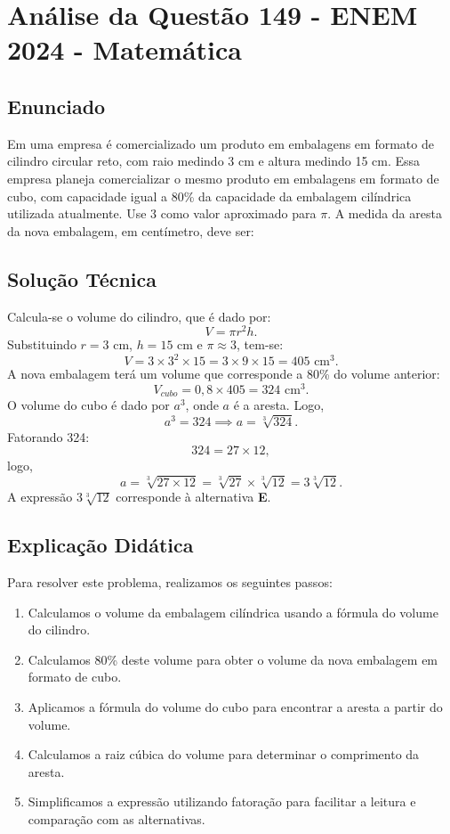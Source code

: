 \documentclass{article}
\begin{document}
\section*{Análise da Questão 149 - ENEM 2024 - Matemática}

\subsection*{Enunciado}
Em uma empresa é comercializado um produto em embalagens em formato de cilindro circular reto, com raio medindo 3 cm e altura medindo 15 cm. Essa empresa planeja comercializar o mesmo produto em embalagens em formato de cubo, com capacidade igual a 80\% da capacidade da embalagem cilíndrica utilizada atualmente. Use 3 como valor aproximado para $\pi$. A medida da aresta da nova embalagem, em centímetro, deve ser:

\bigskip

\subsection*{Solução Técnica}

Calcula-se o volume do cilindro, que é dado por:
\[
V = \pi r^{2} h.
\]
Substituindo $r = 3$ cm, $h = 15$ cm e $\pi \approx 3$, tem-se:
\[
V = 3 \times 3^{2} \times 15 = 3 \times 9 \times 15 = 405 \text{ cm}^3.
\]
A nova embalagem terá um volume que corresponde a 80\% do volume anterior:
\[
V_{cubo} = 0,8 \times 405 = 324 \text{ cm}^3.
\]
O volume do cubo é dado por $a^{3}$, onde $a$ é a aresta. Logo,
\[
a^{3} = 324 \implies a = \sqrt[3]{324}.
\]
Fatorando 324:
\[
324 = 27 \times 12,
\]
logo,
\[
a = \sqrt[3]{27 \times 12} = \sqrt[3]{27} \times \sqrt[3]{12} = 3 \sqrt[3]{12}.
\]
A expressão $3 \sqrt[3]{12}$ corresponde à alternativa \textbf{E}.

\subsection*{Explicação Didática}

Para resolver este problema, realizamos os seguintes passos:
\begin{enumerate}
  \item Calculamos o volume da embalagem cilíndrica usando a fórmula do volume do cilindro.
  \item Calculamos 80\% deste volume para obter o volume da nova embalagem em formato de cubo.
  \item Aplicamos a fórmula do volume do cubo para encontrar a aresta a partir do volume.
  \item Calculamos a raiz cúbica do volume para determinar o comprimento da aresta.
  \item Simplificamos a expressão utilizando fatoração para facilitar a leitura e comparação com as alternativas.
\end{enumerate}
\end{document}
